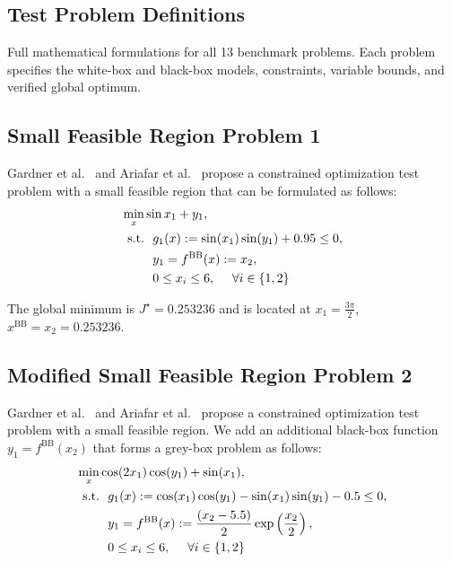 \documentclass[12pt,a4paper]{article}%
\theoremstyle{plain}%
\theoremstyle{remark}%
\theoremstyle{definition}%
\def\BB{\mathrm{BB}}
\begin{document}
\begin{appendices}
\section{Test Problem Definitions}\label{sec:test_problems}

Full mathematical formulations for all 13 benchmark problems. Each problem specifies the white-box and black-box models, constraints, variable bounds, and verified global optimum.

\subsection{Small Feasible Region Problem 1}\label{subsec:app_sfr1}
Gardner et al.~\cite{gardner2014} and Ariafar et al.~\cite{Ariafar2019} propose a constrained optimization test problem with a small feasible region that can be formulated as follows:
\begin{align}
    \min_{x} & \sin{x_1} + y_1, \\\notag
    \text{s.t.} &~~ g_1(x) := \sin(x_1)\sin(y_1) + 0.95 \leq 0, \\\notag
    &~~ y_1 = f^\BB(x) := x_2, \\\notag
    &~~ 0 \leq x_i \leq 6, ~~~~ \forall i \in \{1, 2\}
\end{align}

The global minimum is $J^\star = 0.253236$ and is located at $x_1=\frac{3\pi}{2}$, $x^{\BB}=x_2=0.253236$.

\subsection{Modified Small Feasible Region Problem 2}\label{subsec:app_sfr2}

Gardner et al.~\cite{gardner2014} and Ariafar et al.~\cite{Ariafar2019} propose a constrained optimization test problem with a small feasible region. We add an additional black-box function $y_1=f^\BB (x_2)$ that forms a grey-box problem as follows:
\begin{align} \label{eq:SmallFeasibleRegion}
    \min_{x} & \cos(2x_1)\cos(y_1) + \sin(x_1), \\\notag
    \text{s.t.} &~~ g_1(x) := \cos(x_1)\cos(y_1) - \sin(x_1)\sin(y_1) - 0.5 \leq 0, \\\notag
    &~~ y_1 = f^\BB(x) := \frac{(x_2 - 5.5)}{2} \exp\left(\frac{x_2}{2}\right), \\\notag
    &~~ 0 \leq x_i \leq 6, ~~~~ \forall i \in \{1, 2\}
\end{align}


\end{appendices}
\end{document}

